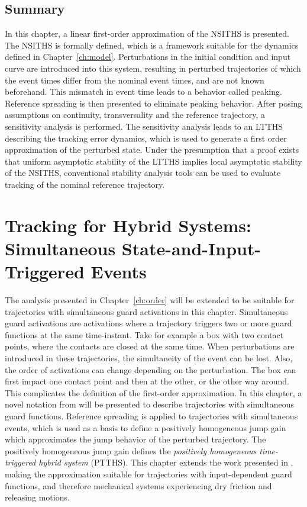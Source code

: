 \documentclass[../DC2017114Bouma.tex]{subfiles}
\begin{document}
\section{Summary}
In this chapter, a linear first-order approximation of the NSITHS is presented. The NSITHS is formally defined, which is a framework suitable for the dynamics defined in Chapter~\ref{ch:model}. Perturbations in the initial condition and input curve are introduced into this system, resulting in perturbed trajectories of which the event times differ from the nominal event times, and are not known beforehand. This mismatch in event time leads to a behavior called peaking. Reference spreading is then presented to eliminate peaking behavior. After posing assumptions on continuity, transversality and the reference trajectory, a sensitivity analysis is performed. The sensitivity analysis leads to an LTTHS describing the tracking error dynamics, which is used to generate a first order approximation of the perturbed state. Under the presumption that a proof exists that uniform asymptotic stability of the LTTHS implies local asymptotic stability of the NSITHS, conventional stability analysis tools can be used to evaluate tracking of the nominal reference trajectory.


\cleartooddpage
\chapter{Tracking for Hybrid Systems: Simultaneous State-and-Input-Triggered Events}\label{ch:simult}
The analysis presented in Chapter~\ref{ch:order} will be extended to be suitable for trajectories with simultaneous guard activations in this chapter. Simultaneous guard activations are activations where a trajectory triggers two or more guard functions at the same time-instant. Take for example a box with two contact points, where the contacts are closed at the same time. When perturbations are introduced in these trajectories, the simultaneity of the event can be lost. Also, the order of activations can change depending on the perturbation. The box can first impact one contact point and then at the other, or the other way around. This complicates the definition of the first-order approximation. In this chapter, a novel notation from \cite{Rijnen2018} will be presented to describe trajectories with simultaneous guard functions. Reference spreading is applied to trajectories with simultaneous events, which is used as a basis to define a positively homogeneous jump gain which approximates the jump behavior of the perturbed trajectory. The positively homogeneous jump gain defines the \textit{positively homogeneous time-triggered hybrid system} (PTTHS). This chapter extends the work presented in \cite{Rijnen2018}, making the approximation suitable for trajectories with input-dependent guard functions, and therefore mechanical systems experiencing dry friction and releasing motions.
\end{document}
